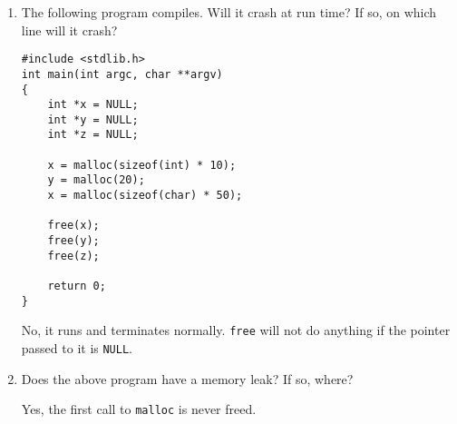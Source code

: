 \begin{enumerate}
\item The following program compiles. Will it crash at run time? If so, on which line will it crash?

\begin{lstlisting}
#include <stdlib.h>
int main(int argc, char **argv)
{
	int *x = NULL;
	int *y = NULL;
	int *z = NULL;

	x = malloc(sizeof(int) * 10);
	y = malloc(20);
	x = malloc(sizeof(char) * 50);

	free(x);
	free(y);
	free(z);

	return 0;
}
\end{lstlisting}

\begin{answer}
No, it runs and terminates normally.
\texttt{free} will not do anything if the pointer passed to it is \texttt{NULL}.
\end{answer}

\item Does the above program have a memory leak? If so, where?

\begin{answer}
Yes, the first call to \texttt{malloc} is never freed.
\end{answer}
\end{enumerate}
